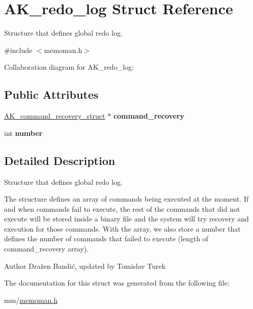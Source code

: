 \hypertarget{structAK__redo__log}{}\section{A\+K\+\_\+redo\+\_\+log Struct Reference}
\label{structAK__redo__log}


Structure that defines global redo log.  




{\ttfamily \#include $<$memoman.\+h$>$}



Collaboration diagram for A\+K\+\_\+redo\+\_\+log\+:
\subsection*{Public Attributes}
\begin{DoxyCompactItemize}
\item 
\hyperlink{structAK__command__recovery__struct}{A\+K\+\_\+command\+\_\+recovery\+\_\+struct} $\ast$ {\bfseries command\+\_\+recovery}\hypertarget{structAK__redo__log_af0118d6a67f343d263618542709b856f}{}\label{structAK__redo__log_af0118d6a67f343d263618542709b856f}

\item 
int {\bfseries number}\hypertarget{structAK__redo__log_acbe6ec888664705a9a2e13c5a70e0c8a}{}\label{structAK__redo__log_acbe6ec888664705a9a2e13c5a70e0c8a}

\end{DoxyCompactItemize}


\subsection{Detailed Description}
Structure that defines global redo log. 

The structure defines an array of commands being executed at the moment. If and when commands fail to execute, the rest of the commands that did not execute will be stored inside a binary file and the system will try recovery and execution for those commands. With the array, we also store a number that defines the number of commands that failed to execute (length of command\+\_\+recovery array). \begin{DoxyAuthor}{Author}
Dražen Bandić, updated by Tomislav Turek 
\end{DoxyAuthor}


The documentation for this struct was generated from the following file\+:\begin{DoxyCompactItemize}
\item 
mm/\hyperlink{memoman_8h}{memoman.\+h}\end{DoxyCompactItemize}

